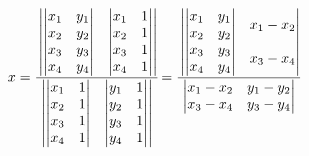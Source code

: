 \begin{remark}
\begin{align*}
  x &= \cfrac{
      \begin{vmatrix}
        \begin{vmatrix} x_1 & y_1 \\ x_2 & y_2 \end{vmatrix} & \begin{vmatrix} x_1 & 1 \\ x_2 & 1 \end{vmatrix} \\
        \begin{vmatrix} x_3 & y_3 \\ x_4 & y_4 \end{vmatrix} & \begin{vmatrix} x_3 & 1 \\ x_4 & 1 \end{vmatrix} 
      \end{vmatrix}}{
      \begin{vmatrix}
        \begin{vmatrix} x_1 & 1 \\ x_2 & 1 \end{vmatrix} & \begin{vmatrix} y_1 & 1 \\ y_2 & 1 \end{vmatrix} \\
        \begin{vmatrix} x_3 & 1 \\ x_4 & 1 \end{vmatrix} & \begin{vmatrix} y_3 & 1 \\ y_4 & 1 \end{vmatrix} 
      \end{vmatrix}} 
    = \cfrac{
      \begin{vmatrix}
        \begin{vmatrix} x_1 & y_1 \\ x_2 & y_2 \end{vmatrix} & x_1 - x_2 \\
        \begin{vmatrix} x_3 & y_3 \\ x_4 & y_4 \end{vmatrix} & x_3 - x_4 
      \end{vmatrix}}{
      \begin{vmatrix}
        x_1 - x_2 & y_1 - y_2 \\
        x_3 - x_4 & y_3 - y_4 
      \end{vmatrix}}\\

\end{align*}
\end{remark}

